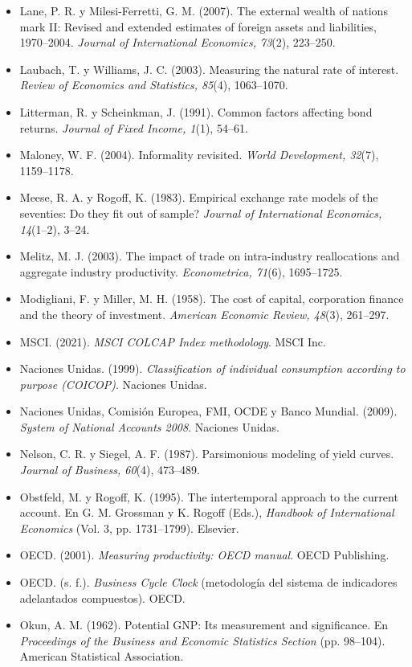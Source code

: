 \begin{itemize}[leftmargin=1.2em,itemindent=-1.2em]
\item[] Lane, P. R. y Milesi-Ferretti, G. M. (2007). The external wealth of nations mark II: Revised and extended estimates of foreign assets and liabilities, 1970–2004. \emph{Journal of International Economics, 73}(2), 223–250.
\item[] Laubach, T. y Williams, J. C. (2003). Measuring the natural rate of interest. \emph{Review of Economics and Statistics, 85}(4), 1063–1070.
\item[] Litterman, R. y Scheinkman, J. (1991). Common factors affecting bond returns. \emph{Journal of Fixed Income, 1}(1), 54–61.
\item[] Maloney, W. F. (2004). Informality revisited. \emph{World Development, 32}(7), 1159–1178.
\item[] Meese, R. A. y Rogoff, K. (1983). Empirical exchange rate models of the seventies: Do they fit out of sample? \emph{Journal of International Economics, 14}(1–2), 3–24.
\item[] Melitz, M. J. (2003). The impact of trade on intra-industry reallocations and aggregate industry productivity. \emph{Econometrica, 71}(6), 1695–1725.
\item[] Modigliani, F. y Miller, M. H. (1958). The cost of capital, corporation finance and the theory of investment. \emph{American Economic Review, 48}(3), 261–297.
\item[] MSCI. (2021). \emph{MSCI COLCAP Index methodology}. MSCI Inc.
\item[] Naciones Unidas. (1999). \emph{Classification of individual consumption according to purpose (COICOP)}. Naciones Unidas.
\item[] Naciones Unidas, Comisión Europea, FMI, OCDE y Banco Mundial. (2009). \emph{System of National Accounts 2008}. Naciones Unidas.
\item[] Nelson, C. R. y Siegel, A. F. (1987). Parsimonious modeling of yield curves. \emph{Journal of Business, 60}(4), 473–489.
\item[] Obstfeld, M. y Rogoff, K. (1995). The intertemporal approach to the current account. En G. M. Grossman y K. Rogoff (Eds.), \emph{Handbook of International Economics} (Vol. 3, pp. 1731–1799). Elsevier.
\item[] OECD. (2001). \emph{Measuring productivity: OECD manual}. OECD Publishing.
\item[] OECD. (s. f.). \emph{Business Cycle Clock} (metodología del sistema de indicadores adelantados compuestos). OECD.
\item[] Okun, A. M. (1962). Potential GNP: Its measurement and significance. En \emph{Proceedings of the Business and Economic Statistics Section} (pp. 98–104). American Statistical Association.

\end{itemize}
